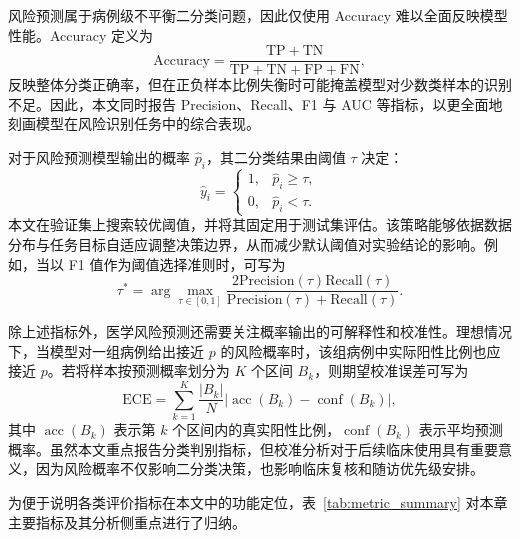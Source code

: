 风险预测属于病例级不平衡二分类问题，因此仅使用 Accuracy 难以全面反映模型性能。Accuracy 定义为
\begin{equation}
\mathrm{Accuracy}=\frac{\mathrm{TP}+\mathrm{TN}}{\mathrm{TP}+\mathrm{TN}+\mathrm{FP}+\mathrm{FN}},
\end{equation}
反映整体分类正确率，但在正负样本比例失衡时可能掩盖模型对少数类样本的识别不足。因此，本文同时报告 Precision、Recall、F1 与 AUC 等指标，以更全面地刻画模型在风险识别任务中的综合表现。

对于风险预测模型输出的概率 $\hat{p}_i$，其二分类结果由阈值 $\tau$ 决定：
\begin{equation}
\hat{y}_i=
\begin{cases}
1, & \hat{p}_i\geq \tau,\\
0, & \hat{p}_i<\tau.
\end{cases}
\end{equation}
本文在验证集上搜索较优阈值，并将其固定用于测试集评估。该策略能够依据数据分布与任务目标自适应调整决策边界，从而减少默认阈值对实验结论的影响。例如，当以 F1 值作为阈值选择准则时，可写为
\begin{equation}
\tau^{\ast}=\arg\max_{\tau\in[0,1]}\frac{2\mathrm{Precision}(\tau)\mathrm{Recall}(\tau)}{\mathrm{Precision}(\tau)+\mathrm{Recall}(\tau)}.
\end{equation}

除上述指标外，医学风险预测还需要关注概率输出的可解释性和校准性。理想情况下，当模型对一组病例给出接近 $p$ 的风险概率时，该组病例中实际阳性比例也应接近 $p$。若将样本按预测概率划分为 $K$ 个区间 $B_k$，则期望校准误差可写为
\begin{equation}
\mathrm{ECE}=\sum_{k=1}^{K}\frac{|B_k|}{N}\left|\operatorname{acc}(B_k)-\operatorname{conf}(B_k)\right|,
\end{equation}
其中 $\operatorname{acc}(B_k)$ 表示第 $k$ 个区间内的真实阳性比例，$\operatorname{conf}(B_k)$ 表示平均预测概率。虽然本文重点报告分类判别指标，但校准分析对于后续临床使用具有重要意义，因为风险概率不仅影响二分类决策，也影响临床复核和随访优先级安排。

为便于说明各类评价指标在本文中的功能定位，表~\ref{tab:metric_summary} 对本章主要指标及其分析侧重点进行了归纳。

